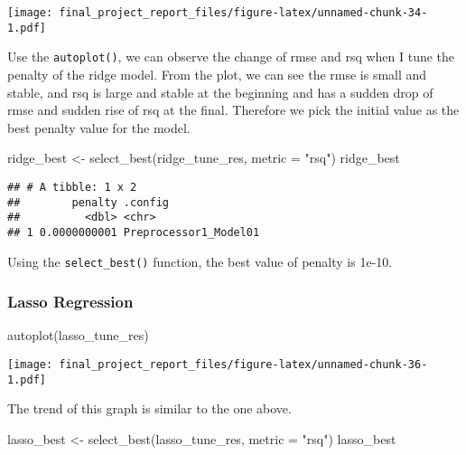 \documentclass[
]{article}
\newenvironment{Shaded}{\begin{snugshade}}{\end{snugshade}}
\newcommand{\AttributeTok}[1]{\textcolor[rgb]{0.77,0.63,0.00}{#1}}
\newcommand{\FunctionTok}[1]{\textcolor[rgb]{0.00,0.00,0.00}{#1}}
\newcommand{\NormalTok}[1]{#1}
\newcommand{\OtherTok}[1]{\textcolor[rgb]{0.56,0.35,0.01}{#1}}
\newcommand{\StringTok}[1]{\textcolor[rgb]{0.31,0.60,0.02}{#1}}
\begin{document}
\texttt{[image: final\_project\_report\_files/figure-latex/unnamed-chunk-34-1.pdf]}

Use the \texttt{autoplot()}, we can observe the change of rmse and rsq
when I tune the penalty of the ridge model. From the plot, we can see
the rmse is small and stable, and rsq is large and stable at the
beginning and has a sudden drop of rmse and sudden rise of rsq at the
final. Therefore we pick the initial value as the best penalty value for
the model.

\begin{Shaded}
\begin{Highlighting}[]
\NormalTok{ridge\_best }\OtherTok{\textless{}{-}} \FunctionTok{select\_best}\NormalTok{(ridge\_tune\_res, }\AttributeTok{metric =} \StringTok{"rsq"}\NormalTok{)}
\NormalTok{ridge\_best}
\end{Highlighting}
\end{Shaded}

\begin{verbatim}
## # A tibble: 1 x 2
##        penalty .config              
##          <dbl> <chr>                
## 1 0.0000000001 Preprocessor1_Model01
\end{verbatim}

Using the \texttt{select\_best()} function, the best value of penalty is
1e-10.

\hypertarget{lasso-regression-1}{%
\subsubsection{Lasso Regression}\label{lasso-regression-1}}

\begin{Shaded}
\begin{Highlighting}[]
\FunctionTok{autoplot}\NormalTok{(lasso\_tune\_res)}
\end{Highlighting}
\end{Shaded}

\texttt{[image: final\_project\_report\_files/figure-latex/unnamed-chunk-36-1.pdf]}

The trend of this graph is similar to the one above.

\begin{Shaded}
\begin{Highlighting}[]
\NormalTok{lasso\_best }\OtherTok{\textless{}{-}} \FunctionTok{select\_best}\NormalTok{(lasso\_tune\_res, }\AttributeTok{metric =} \StringTok{"rsq"}\NormalTok{)}
\NormalTok{lasso\_best}
\end{Highlighting}
\end{Shaded}
\end{document}
